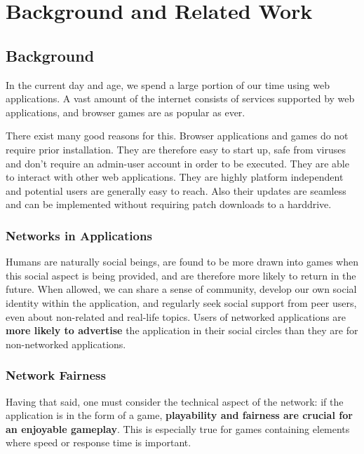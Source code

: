 \documentclass[bsc,frontabs,twoside,singlespacing,parskip,deptreport]{infthesis}     %
\begin{document}
\tableofcontents




\chapter{Background and Related Work}
\section{Background}
In the current day and age, we spend a large portion of our time using web applications. A vast amount of the internet consists of services supported by web applications, and browser games are as popular as ever.

There exist many good reasons for this. Browser applications and games do not require prior installation. They are therefore easy to start up, safe from viruses and don't require an admin-user account in order to be executed\cite{Web_Apps_Superior}. They are able to interact with other web applications. They are highly platform independent and potential users are generally easy to reach. Also their updates are seamless and can be implemented without requiring patch downloads to a harddrive.
\subsection{Networks in Applications}
Humans are naturally social beings, are found to be more drawn into games when this social aspect is being provided, and are therefore more likely to return in the future\cite{Browser_Games}. When allowed, we can share a sense of community, develop our own social identity within the application, and regularly seek social support from peer users, even about non-related and real-life topics\cite{Community_Social_Psychology}. Users of networked applications are \textbf{more likely to advertise} the application in their social circles than they are for non-networked applications.

\subsection{Network Fairness}
Having that said, one must consider the technical aspect of the network: if the application is in the form of a game, \textbf{playability and fairness are crucial for an enjoyable gameplay}. This is especially true for games containing elements where speed or response time is important.
\end{document}
